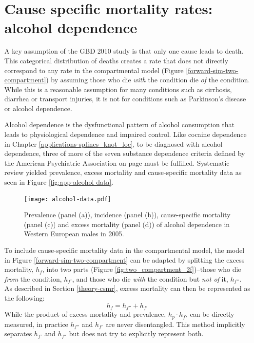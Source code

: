 \chapter{Cause specific mortality rates: alcohol dependence}
\label{applications-csmr}

A key assumption of the GBD 2010 study is that only one cause leads to
death.  This categorical distribution of deaths creates a rate that
does not directly correspond to any rate in the compartmental model
(Figure \ref{forward-sim-two-compartment}) by assuming those who die
\emph{with} the condition die \emph{of} the condition.  While this is
a reasonable assumption for many conditions such as cirrhosis,
diarrhea or transport injuries, it is not for conditions such as
Parkinson's disease or alcohol dependence.

Alcohol dependence is the dysfunctional pattern of alcohol consumption
that leads to physiological dependence and impaired control.  Like
cocaine dependence in Chapter \ref{applications-splines_knot_loc}, to
be diagnosed with alcohol dependence, three of more of the seven
substance dependence criteria defined by the American Psychiatric
Association on page \pageref{page:app-substance_dependence} must be
fulfilled. \cite{american_diagnostic_2000, hasin_prevalence_2007}
Systematic review yielded prevalence, excess mortality and
cause-specific mortality data as seen in Figure \ref{fig:app-alcohol
  data}.

    \begin{figure}[h]
        \begin{center}
            \texttt{[image: alcohol-data.pdf]}
            \caption{Prevalence (panel (a)), incidence (panel (b)),
              cause-specific mortality (panel (c)) and excess
              mortality (panel (d)) of alcohol dependence in Western
              European males in 2005.}
            \label{fig:app-alcohol data}
        \end{center}
    \end{figure}

To include cause-specific mortality data in the compartmental model,
the model in Figure \ref{forward-sim-two-compartment} can be adapted
by splitting the excess mortality, $h_{f}$, into two parts (Figure
\ref{fig:two_compartment_2f})--those who die \emph{from} the
condition, $h_{f'}$, and those who die \emph{with} the condition but
\emph{not of} it, $h_{f''}$.  As described in Section
\ref{theory-csmr}, excess mortality can then be represented as the
following:
    \begin{equation}
        h_{f} = h_{f''} + h_{f'}
    \end{equation}
While the product of excess mortality and prevalence, $h_{p} \cdot h_{f}$,
can be directly measured, in practice $h_{f''}$ and $h_{f'}$ are never
disentangled.  This method implicitly separates $h_{f'}$ and $h_{f''}$
but does not try to explicitly represent both.

